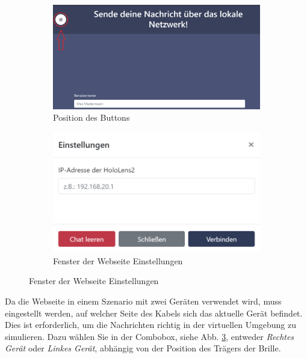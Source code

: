 \begin{figure}[H]
    \centering
    \begin{subfigure}[b]{0.7\textwidth}
        \centering
        \includegraphics[width=\textwidth]{images/WebButton.png}
        \caption{Position des Buttons}
        \label{fig:webbut}
    \end{subfigure}
    \hfill
    \begin{subfigure}[b]{0.4\textwidth}
        \centering
        \includegraphics[width=\textwidth]{images/WebseiteSettings.png}
        \caption{Fenster der Webseite Einstellungen}
        \label{fig:websettings}
    \end{subfigure}
\end{figure}

Da die Webseite in einem Szenario mit zwei Geräten verwendet wird, muss eingestellt werden, auf welcher Seite des Kabels
sich das aktuelle Gerät befindet. Dies ist erforderlich, um die Nachrichten richtig in der virtuellen Umgebung zu simulieren. Dazu wählen Sie in der Combobox, siehe Abb. \ref{fig:websettings}, entweder \textit{Rechtes Gerät} oder \textit{Linkes Gerät}, abhängig von der Position des Trägers der Brille.

